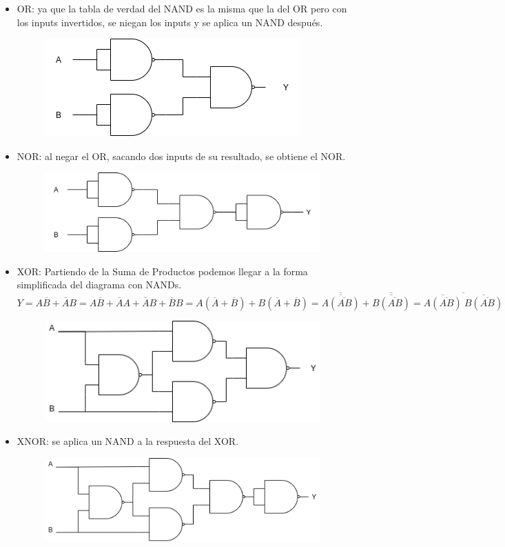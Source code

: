 \documentclass[11pt,a4paper]{article}
\begin{document}
\begin{enumerate}
\begin{itemize}
\item OR: ya que la tabla de verdad del NAND es la misma que la del OR pero con los inputs invertidos, se niegan los inputs y se aplica un NAND después.
\begin{figure}[h]
\centering
\includegraphics[scale=0.5]{4.png} 
\end{figure}
\item NOR: al negar el OR, sacando dos inputs de su resultado, se obtiene el NOR.
\begin{figure}[h!]
\centering
\includegraphics[scale=0.5]{5.png} 
\end{figure}
\item XOR: Partiendo de la Suma de Productos podemos llegar a la forma simplificada del diagrama con NANDs.
 $Y = A\overline{B}+\overline{A}B=
 A\overline{B} + \overline{A}A + \overline{A}B + \overline{B}B=A(\overline{A}+\overline{B}) + B(\overline{A}+\overline{B}) = \overline{\overline{A(\overline{AB})}}+\overline{\overline{B(\overline{AB})}} = \overline{\overline{A(\overline{AB})} \    
 \overline{B(\overline{AB})}}$
 
\begin{figure}[h!]
\centering
\includegraphics[scale=0.5]{6.png} 
\end{figure}
\item XNOR: se aplica un NAND a la respuesta del XOR.
\begin{figure}[h!]
\centering
\includegraphics[scale=0.5]{7.png} 
\end{figure}

\end{itemize}
\end{enumerate}
\end{document}
